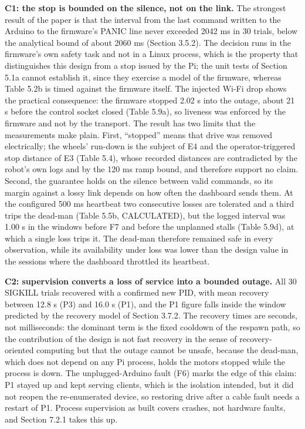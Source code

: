 \textbf{C1: the stop is bounded on the silence, not on the link.} The strongest result of the paper is that the interval from the last command written to the Arduino to the firmware's PANIC line never exceeded 2042 ms in 30 trials, below the analytical bound of about 2060 ms (Section 3.5.2). The decision runs in the firmware's own safety task and not in a Linux process, which is the property that distinguishes this design from a stop issued by the Pi; the unit tests of Section 5.1a cannot establish it, since they exercise a model of the firmware, whereas Table 5.2b is timed against the firmware itself. The injected Wi-Fi drop shows the practical consequence: the firmware stopped 2.02 s into the outage, about 21 s before the control socket closed (Table 5.9a), so liveness was enforced by the firmware and not by the transport. The result has two limits that the measurements make plain. First, ``stopped'' means that drive was removed electrically; the wheels' run-down is the subject of E4 and the operator-triggered stop distance of E3 (Table 5.4), whose recorded distances are contradicted by the robot's own logs and by the 120 ms ramp bound, and therefore support no claim. Second, the guarantee holds on the silence between valid commands, so its margin against a lossy link depends on how often the dashboard sends them. At the configured 500 ms heartbeat two consecutive losses are tolerated and a third trips the dead-man (Table 5.5b, CALCULATED), but the logged interval was 1.00 s in the windows before F7 and before the unplanned stalls (Table 5.9d), at which a single loss trips it. The dead-man therefore remained safe in every observation, while its availability under loss was lower than the design value in the sessions where the dashboard throttled its heartbeat.

\textbf{C2: supervision converts a loss of service into a bounded outage.} All 30 SIGKILL trials recovered with a confirmed new PID, with mean recovery between 12.8 s (P3) and 16.0 s (P1), and the P1 figure falls inside the window predicted by the recovery model of Section 3.7.2. The recovery times are seconds, not milliseconds: the dominant term is the fixed cooldown of the respawn path, so the contribution of the design is not fast recovery in the sense of recovery-oriented computing \cite{candea2004} but that the outage cannot be unsafe, because the dead-man, which does not depend on any Pi process, holds the motors stopped while the process is down. The unplugged-Arduino fault (F6) marks the edge of this claim: P1 stayed up and kept serving clients, which is the isolation intended, but it did not reopen the re-enumerated device, so restoring drive after a cable fault needs a restart of P1. Process supervision as built covers crashes, not hardware faults, and Section 7.2.1 takes this up.

